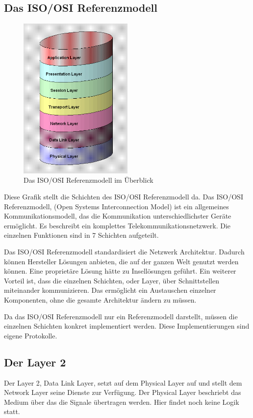\documentclass[12pt, a4paper, ngerman]{article}
\newcommand{\osi}{ISO/OSI Referenzmodell\xspace}
\begin{document}
\subsection{Das \osi}
\begin{figure}[h]
\includegraphics[width=0.5\textwidth]{Grafiken/osi_modell.jpg}
\caption{Das \osi im Überblick \cite{osi_modell}}
\label{osi_modell}
\end{figure} 
Diese Grafik stellt die Schichten des \osi da. Das \osi, (Open Systems Interconnection Model) ist ein allgemeines Kommunikationsmodell,  das die Kommunikation unterschiedlichster Geräte ermöglicht. Es beschreibt ein komplettes Telekommunikationsnetzwerk. Die einzelnen Funktionen sind in 7 Schichten aufgeteilt. 

Das \osi standardisiert die Netzwerk Architektur. Dadurch können Hersteller Lösungen anbieten, die auf der ganzen Welt genutzt werden können. Eine proprietäre Lösung hätte zu Insellösungen geführt. Ein weiterer Vorteil ist, dass die einzelnen Schichten, oder Layer, über Schnittstellen miteinander kommunizieren. Das ermöglicht ein Austauschen einzelner Komponenten, ohne die gesamte Architektur ändern zu müssen.

Da das \osi nur ein Referenzmodell darstellt, müssen die einzelnen Schichten konkret implementiert werden. Diese Implementierungen sind eigene Protokolle. 

\subsection{Der Layer 2}
Der Layer 2, Data Link Layer, setzt auf dem Physical Layer auf und stellt dem Network Layer seine Dienste zur Verfügung. Der Physical Layer beschriebt das Medium über das die Signale übertragen werden. Hier findet noch keine Logik statt. 
\end{document}
